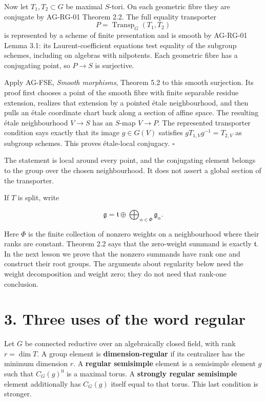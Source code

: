 \documentclass[11pt,a4paper,openany]{report}
\begin{document}
Now let \(T_1,T_2\subset G\) be maximal \(S\)-tori. On each geometric fibre they are conjugate by AG-RG-01 Theorem 2.2. The full equality transporter \[
 P=\operatorname{Transp}_G(T_1,T_2)
\] is represented by a scheme of finite presentation and is smooth by AG-RG-01 Lemma 3.1: its Laurent-coefficient equations test equality of the subgroup schemes, including on algebras with nilpotents. Each geometric fibre has a conjugating point, so \(P\to S\) is surjective.

Apply AG-FSE, \emph{Smooth morphisms}, Theorem 5.2 to this smooth surjection. Its proof first chooses a point of the smooth fibre with finite separable residue extension, realizes that extension by a pointed étale neighbourhood, and then pulls an étale coordinate chart back along a section of affine space. The resulting étale neighbourhood \(V\to S\) has an \(S\)-map \(V\to P\). The represented transporter condition says exactly that its image \(g\in G(V)\) satisfies \(gT_{1,V}g^{-1}=T_{2,V}\) as subgroup schemes. This proves étale-local conjugacy. \(\square\)

The statement is local around every point, and the conjugating element belongs to the group over the chosen neighbourhood. It does not assert a global section of the transporter.

If \(T\) is split, write

\[
\mathfrak g=\mathfrak t\oplus\bigoplus_{\alpha\in\Phi}\mathfrak g_\alpha.
\]

Here \(\Phi\) is the finite collection of nonzero weights on a neighbourhood where their ranks are constant. Theorem 2.2 says that the zero-weight summand is exactly \(\mathfrak t\). In the next lesson we prove that the nonzero summands have rank one and construct their root groups. The arguments about regularity below need the weight decomposition and weight zero; they do not need that rank-one conclusion.

\section{3. Three uses of the word regular}\label{AG-RG-02-three-uses-of-the-word-regular}

Let \(G\) be connected reductive over an algebraically closed field, with rank \(r=\dim T\). A group element is \textbf{dimension-regular} if its centralizer has the minimum dimension \(r\). A \textbf{regular semisimple} element is a semisimple element \(g\) such that \(C_G(g)^0\) is a maximal torus. A \textbf{strongly regular semisimple} element additionally has \(C_G(g)\) itself equal to that torus. This last condition is stronger.
\end{document}
